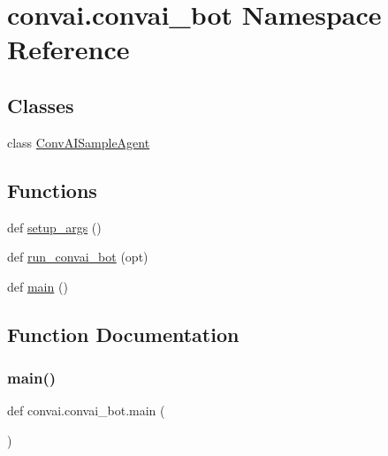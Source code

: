\hypertarget{namespaceconvai_1_1convai__bot}{}\section{convai.\+convai\+\_\+bot Namespace Reference}
\label{namespaceconvai_1_1convai__bot}
\subsection*{Classes}
\begin{DoxyCompactItemize}
\item 
class \hyperlink{classconvai_1_1convai__bot_1_1ConvAISampleAgent}{Conv\+A\+I\+Sample\+Agent}
\end{DoxyCompactItemize}
\subsection*{Functions}
\begin{DoxyCompactItemize}
\item 
def \hyperlink{namespaceconvai_1_1convai__bot_a3bfdfe9427fd3c0afc9c28f092953ec2}{setup\+\_\+args} ()
\item 
def \hyperlink{namespaceconvai_1_1convai__bot_aa48fc69074ce03959653a0122c4a0b67}{run\+\_\+convai\+\_\+bot} (opt)
\item 
def \hyperlink{namespaceconvai_1_1convai__bot_abdce1d79f12edc77b5ff6c02b00d1219}{main} ()
\end{DoxyCompactItemize}


\subsection{Function Documentation}
\mbox{\label{namespaceconvai_1_1convai__bot_abdce1d79f12edc77b5ff6c02b00d1219}} 
\subsubsection{\texorpdfstring{main()}{main()}}
{\footnotesize\ttfamily def convai.\+convai\+\_\+bot.\+main (\begin{DoxyParamCaption}{ }\end{DoxyParamCaption})}



